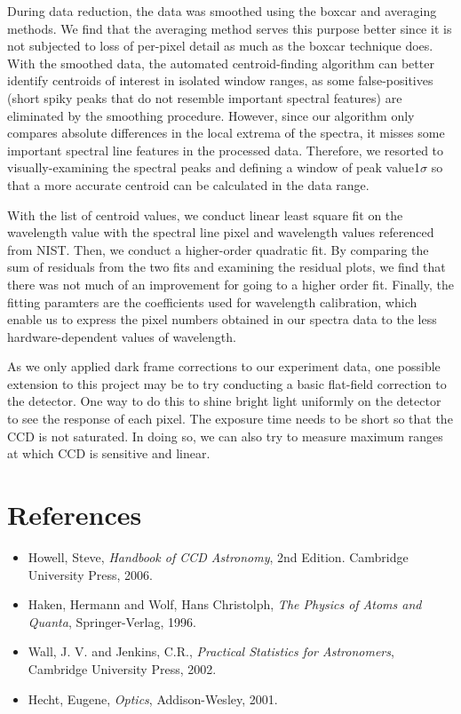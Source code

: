 \documentclass[authoryear, 12pt,5p, times]{elsarticle}
\newcommand{\rpm}{\raisebox{.2ex}{$\scriptstyle\pm$}}
\begin{document}
During data reduction, the data was smoothed using the boxcar and averaging methods. We find that the averaging method serves this purpose better since it is not subjected to loss of per-pixel detail as much as the boxcar technique does. With the smoothed data, the automated centroid-finding algorithm can better identify centroids of interest in isolated window ranges, as some false-positives (short spiky peaks that do not resemble important spectral features) are eliminated by the smoothing procedure. However, since our algorithm only compares absolute differences in the local extrema of the spectra, it misses some important spectral line features in the  processed data. Therefore, we resorted to visually-examining the spectral peaks and defining a window of peak value\rpm 1$\sigma$ so that a more accurate centroid can be calculated in the data range.

With the list of centroid values, we conduct linear least square fit on the wavelength value with the  spectral line pixel and wavelength values referenced from NIST. Then, we conduct a higher-order quadratic fit. By comparing the sum of residuals from the two fits and examining the residual plots, we find that there was not much of an improvement for going to a higher order fit. Finally, the fitting paramters are the coefficients used for wavelength calibration, which enable us to express the pixel numbers obtained in our spectra data to the less hardware-dependent values of wavelength.
	
As we only applied dark frame corrections to our experiment data, one possible extension to this project may be to try conducting a basic flat-field correction to the detector. One way to do this to shine bright light uniformly on the detector to see the response of each pixel. The exposure time needs to be short so that the CCD is not saturated. In doing so, we can also try to measure maximum ranges at which CCD is sensitive and linear.
\section{References}
%
\begin{itemize}
\item Howell, Steve,  \textit{Handbook of CCD Astronomy}, 2nd Edition. Cambridge University Press, 2006.
\item Haken, Hermann and Wolf, Hans Christolph, \textit{The Physics of Atoms and Quanta}, Springer-Verlag, 1996.
\item Wall, J. V. and Jenkins, C.R., \textit{Practical Statistics for Astronomers}, Cambridge University Press, 2002.
\item Hecht, Eugene, \textit{Optics}, Addison-Wesley, 2001.
\end{itemize}
\end{document}
